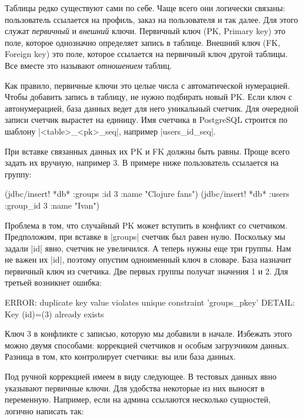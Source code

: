 Таблицы редко существуют сами по себе. Чаще всего они логически связаны:
пользователь ссылается на профиль, заказ на пользователя и так далее. Для этого
служат \emph{первичный} и \emph{внешний} ключи. Первичный ключ (PK, Primary key)
это поле, которое однозначно определяет запись в таблице. Внешний ключ (FK,
Foreign key) это поле, которое ссылается на первичный ключ другой таблицы. Все
вместе это называют \emph{отношением} таблиц.

Как правило, первичные ключи это целые числа с автоматической нумерацией. Чтобы
добавить запись в таблицу, не нужно подбирать новый PK. Если ключ с
автонумерацией, база данных ведет для него уникальный счетчик. Для очередной
записи счетчик вырастет на единицу. Имя счетчика в PostgreSQL строится по
шаблону \spverb|<table>_<pk>_seq|, например \spverb|users_id_seq|.

При вставке связанных данных их PK и FK должны быть равны. Проще всего задать их
вручную, например 3. В примере ниже пользователь ссылается на группу:

\begin{english}
  \begin{clojure}
(jdbc/insert! *db* :groups {:id 3 :name "Clojure fans"})
(jdbc/insert! *db* :users {:group_id 3 :name "Ivan"})
  \end{clojure}
\end{english}

Проблема в том, что случайный PK может вступить в конфликт со
счетчиком. Предположим, при вставке в \spverb|groups| счетчик был равен
нулю. Поскольку мы задали \spverb|id| явно, счетчик не увеличился. А теперь
нужны еще три группы. Нам не важен их \spverb|id|, поэтому опустим одноименный
ключ в словаре.  База назначит первичный ключ из счетчика. Две первых группы
получат значения 1 и 2. Для третьей возникнет ошибка:

\begin{english}
  \begin{text}
ERROR:  duplicate key value violates unique constraint 'groups_pkey'
DETAIL:  Key (id)=(3) already exists
  \end{text}
\end{english}

Ключ 3 в конфликте с записью, которую мы добавили в начале. Избежать этого можно
двумя способами: коррекцией счетчиков и особым загрузчиком данных. Разница в
том, кто контролирует счетчики: вы или база данных.

Под ручной коррекцией имеем в виду следующее. В тестовых данных явно указывают
первичные ключи. Для удобства некоторые из них выносят в переменную. Например,
если на админа ссылаются несколько сущностей, логично написать так:

